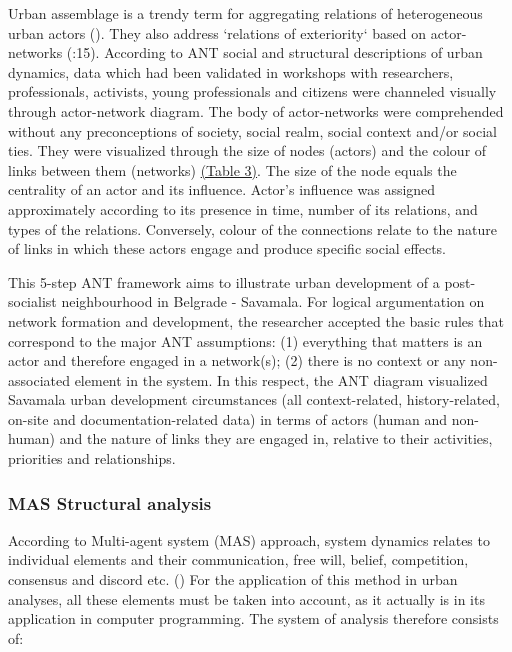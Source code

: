 \documentclass[11pt]{report}
\begin{document}
\begin{enumerate}
Urban assemblage is a trendy term for aggregating relations of heterogeneous urban actors (\cite{Muniesa et al. 2007}). They also address `relations of exteriority` based on actor-networks (\cite{Farías 2011}:15).
According to ANT social and structural descriptions of urban dynamics, data which had been validated in workshops with researchers, professionals, activists, young professionals and citizens were channeled visually through actor-network diagram. The body of actor-networks were comprehended without any preconceptions of society, social realm, social context and/or social ties. They were visualized through the size of nodes (actors) and the colour of links between them (networks) \href{}{(Table 3)}. The size of the node equals the centrality of an actor and its influence. Actor’s influence was assigned approximately according to its presence in time, number of its relations, and types of the relations. Conversely, colour of the connections relate to the nature of links in which these actors engage and produce specific social effects.
\end{enumerate}

This 5-step ANT framework aims to illustrate urban development of a post-socialist neighbourhood in Belgrade - Savamala. For logical argumentation on network formation and development, the researcher accepted the basic rules that correspond to the major ANT assumptions:
(1) everything that matters is an actor and therefore engaged in a network(s);
(2) there is no context or any non-associated element in the system. In this respect, the ANT diagram visualized Savamala urban development circumstances (all context-related, history-related, on-site and documentation-related data) in terms of actors (human and non-human) and the nature of links they are engaged in, relative to their activities, priorities and relationships.


\subsubsection{MAS Structural analysis}

According to Multi-agent system (MAS) approach, system dynamics relates to individual elements and their communication, free will, belief, competition, consensus and discord etc. (\cite{Ferber 1999})
For the application of this method in urban analyses, all these elements must be taken into account, as it actually is in its application in computer programming. The system of analysis therefore consists of:
\end{document}
